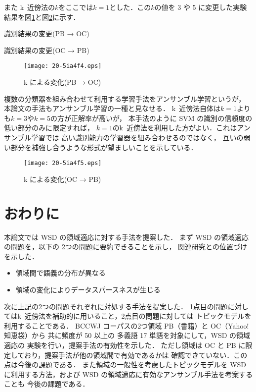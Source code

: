 \documentclass[japanese]{jnlp_1.4}
\begin{document}
また k~近傍法の\( k \)をここでは\( k = 1 \)とした．この\( k \)の値を
3 や 5 に変更した実験結果を\mbox{図\ref{kekka3}}と\mbox{図\ref{kekka4}}に示す．

\begin{table}[p]
\begin{minipage}[t]{.45\textwidth}
\caption{識別結果の変更(PB → OC)}
\label{tab:change1}

\end{minipage}
\hfill
\begin{minipage}[t]{.45\textwidth}
\caption{識別結果の変更(OC → PB)}
\label{tab:change2}

\end{minipage}
\end{table}
\begin{figure}[p]
\begin{center}
\texttt{[image: 20-5ia4f4.eps]}
\end{center}
\caption{k による変化(PB → OC)}
\label{kekka3}
\end{figure} 

複数の分類器を組み合わせて利用する学習手法をアンサンブル学習というが，
本論文の手法もアンサンブル学習の一種と見なせる．
k~近傍法自体は\( k = 1 \)よりも\( k = 3 \)や\( k = 5 \)の方が正解率が高いが，
本手法のように SVM の識別の信頼度の低い部分のみに限定すれば，
\( k = 1 \)の\mbox{k~近傍法}を利用した方がよい．これはアンサンブル学習では
高い識別能力の学習器を組み合わせるのではなく，
互いの弱い部分を補強し合うような形式が望ましいことを示している．

\begin{figure}[t]
\begin{center}
\texttt{[image: 20-5ia4f5.eps]}
\end{center}
\caption{k による変化(OC → PB)}
\label{kekka4}
\end{figure} 




\section{おわりに}

本論文では WSD の領域適応に対する手法を提案した．
まず WSD の領域適応の問題を，以下の 2つの問題に要約できることを示し，
関連研究との位置づけを示した．
\begin{itemize}
      \item 領域間で語義の分布が異なる
      \item 領域の変化によりデータスパースネスが生じる
\end{itemize}
次に上記の2つの問題それぞれに対処する手法を提案した．
1点目の問題に対してはk~近傍法を補助的に用いること，2点目の問題に対しては
トピックモデルを利用することである．
BCCWJ コーパスの2つ領域 PB（書籍）と OC（Yahoo!知恵袋）から
共に頻度が 50 以上の 多義語 17 単語を対象にして，WSD の領域適応の
実験を行い，提案手法の有効性を示した．
ただし領域は OC と PB に限定しており，提案手法が他の領域間で有効であるかは
確認できていない．この点は今後の課題である．
また領域の一般性を考慮したトピックモデルを WSD に利用する方法，および
WSD の領域適応に有効なアンサンブル手法を考案することも
今後の課題である．
\end{document}
